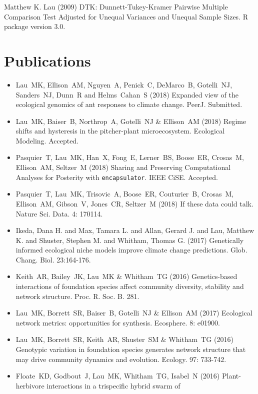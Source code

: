 \documentclass[a4paper]{article}
\begin{document}
{Matthew K. Lau (2009) DTK: Dunnett-Tukey-Kramer Pairwise Multiple
Comparison Test Adjusted for Unequal Variances and Unequal Sample Sizes.
R package version 3.0.}

\section{Publications}\label{publications}

\begin{itemize}
\item 
  Lau~MK, Ellison~AM, Nguyen~A, Penick~C, DeMarco~B, Gotelli~NJ,
  Sanders~NJ, Dunn~R and Helms~Cahan~S (2018) Expanded view of the
  ecological genomics of ant responses to climate
  change. PeerJ. Submitted.
\item 
  Lau~MK, Baiser~B, Northrop~A, Gotelli~NJ \& Ellison~AM (2018) Regime
  shifts and hysteresis in the pitcher-plant
  microecosystem. Ecological Modeling. Accepted.
\item 
  Pasquier~T, Lau~MK, Han~X, Fong~E, Lerner~BS, Boose~ER, Crosas~M,
  Ellison~AM, Seltzer~M (2018) Sharing and Preserving Computational
  Analyses for Posterity with \texttt{encapsulator}. IEEE
  CiSE. Accepted.
\item 
  Pasquier~T, Lau~MK, Trisovic~A, Boose~ER, Couturier~B, Crosas~M,
  Ellison~AM, Gibson~V, Jones~CR, Seltzer~M (2018) If these data could
  talk. Nature Sci. Data. 4: 170114.
\item  
  Ikeda, Dana H. and Max, Tamara L. and Allan, Gerard J. and Lau,
  Matthew K. and Shuster, Stephen M. and Whitham, Thomas G. (2017)
  Genetically informed ecological niche models improve climate change
  predictions. Glob. Chang. Biol. 23:164-176.
\item 
  Keith~AR, Bailey~JK, Lau~MK \& Whitham~TG (2016) Genetics-based
  interactions of foundation species affect community diversity,
  stability and network structure. Proc. R. Soc. B. 281.
\item  
  Lau~MK, Borrett~SR, Baiser~B, Gotelli~NJ \& Ellison~AM (2017)
  Ecological network metrics: opportunities for
  synthesis. Ecosphere. 8: e01900.
\item
  Lau~MK, Borrett~SR, Keith~AR, Shuster~SM \& Whitham~TG (2016)
  Genotypic variation in foundation species generates network
  structure that may drive community dynamics and
  evolution. Ecology. 97: 733-742.
\item
  Floate~KD, Godbout~J, Lau~MK, Whitham~TG, Isabel~N (2016)
  Plant-herbivore interactions in a trispecific hybrid swarm of

\end{itemize}
\end{document}
